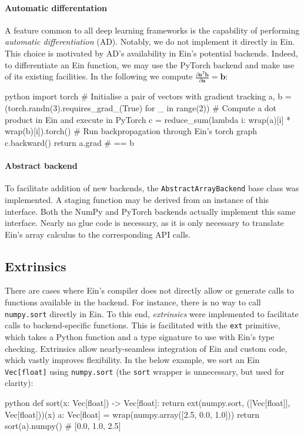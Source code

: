 \paragraph{Automatic differentation} A feature common to all deep learning frameworks is the capability of performing \textit{automatic differentiation} (AD). Notably, we do not implement it directly in Ein. This choice is motivated by AD's availability in Ein's potential backends. Indeed, to differentiate an Ein function, we may use the PyTorch backend and make use of its existing facilities. In the following we compute $\frac{\partial \mathbf{a}^T \mathbf{b}}{\partial \mathbf{a}} = \mathbf{b}$:
\begin{center}
\begin{cminted}{python}
import torch
# Initialise a pair of vectors with gradient tracking
a, b = (torch.randn(3).requires_grad_(True) for _ in range(2))
# Compute a dot product in Ein and execute in PyTorch
c = reduce_sum(lambda i: wrap(a)[i] * wrap(b)[i]).torch()
# Run backpropagation through Ein's torch graph
c.backward()
return a.grad  # == b
\end{cminted}
\end{center}

\paragraph{Abstract backend} To facilitate addition of new backends, the \texttt{AbstractArrayBackend} base class was implemented. A staging function may be derived from an instance of this interface. Both the NumPy and PyTorch backends actually implement this same interface. Nearly no glue code is necessary, as it is only necessary to translate Ein's array calculus to the corresponding API calls.

\subsection{Extrinsics}

There are cases where Ein's compiler does not directly allow or generate calls to functions available in the backend. For instance, there is no way to call \texttt{numpy.sort} directly in Ein. To this end, \textit{extrinsics} were implemented to facilitate calls to backend-specific functions. This is facilitated with the \texttt{ext} primitive, which takes a Python function and a type signature to use with Ein's type checking. Extrinsics allow nearly-seamless integration of Ein and custom code, which vastly improves flexibility. In the below example, we sort an Ein \texttt{Vec[float]} using \texttt{numpy.sort} (the \texttt{sort} wrapper is unnecessary, but used for clarity):
\begin{center}
\begin{cminted}{python}    
def sort(x: Vec[float]) -> Vec[float]:
    return ext(numpy.sort, ([Vec[float]], Vec[float]))(x)
a: Vec[float] = wrap(numpy.array([2.5, 0.0, 1.0]))
return sort(a).numpy()  # [0.0, 1.0, 2.5]
\end{cminted}
\end{center}

